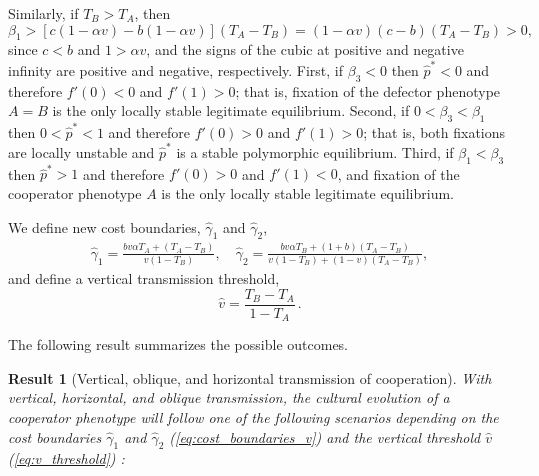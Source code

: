 \documentclass[12pt]{extarticle}
\newtheorem{result}{Result}
\begin{document}
{Similarly, if $T_B>T_A$, then
\begin{equation} \label{eq:beta1_rev}
   \beta_1 > [c(1-\alpha v) - b(1-\alpha v)] (T_A-T_B) 
   = (1-\alpha v)(c-b)(T_A-T_B) > 0,
 \end{equation}
since $c<b$ and $1>\alpha v$, and the signs of the cubic at positive and negative infinity are positive and negative, respectively. 
First, if $\beta_3<0$ then $\hat{p}^*<0$ and therefore $f'(0)<0$ and $f'(1)>0$; that is, fixation of the defector phenotype $A=B$ is the only locally stable legitimate equilibrium.
Second, if $0<\beta_3<\beta_1$ then $0<\hat{p}^*<1$ and therefore $f'(0)>0$ and $f'(1)>0$; that is, both fixations are locally unstable and $\hat{p}^*$ is a stable polymorphic equilibrium.
Third, if $\beta_1<\beta_3$ then $\hat{p}^*>1$ and therefore $f'(0)>0$ and $f'(1)<0$, and fixation of the cooperator phenotype $A$ is the only locally stable legitimate equilibrium.

We define new cost boundaries, $\hat\gamma_1$ and $\hat\gamma_2$,
\begin{equation} \label{eq:cost_boundaries_v}
\begin{aligned}
\hat\gamma_1 = \frac{b v \alpha T_A + (T_A - T_B)}{v(1-T_B)}, \quad
\hat\gamma_2 = \frac{b v \alpha T_B + (1+b) (T_A - T_B)}{v(1-T_B) + (1-v)(T_A-T_B)},
\end{aligned}
\end{equation}
and define a vertical transmission threshold,
\begin{equation} \label{eq:v_threshold}
\hat v = \frac{T_B - T_A}{1-T_A} \,.
\end{equation}

The following result summarizes the possible outcomes.
\\

\begin{result}[Vertical, oblique, and horizontal transmission of cooperation] \label{result:vert_obli_hori}
With vertical, horizontal, and oblique transmission, the cultural evolution of a cooperator phenotype will follow one of the following scenarios depending on the cost boundaries $\hat\gamma_1$ and $\hat\gamma_2$ (\autoref{eq:cost_boundaries_v}) and the vertical threshold $\hat v$ (\autoref{eq:v_threshold}) :



\end{result}}
\end{document}
